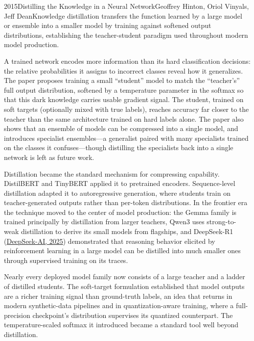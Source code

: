 
\begin{papersummary}{2015}{Distilling the Knowledge in a Neural Network}{Geoffrey Hinton, Oriol Vinyals, Jeff Dean}{Knowledge distillation transfers the function learned by a large model or ensemble into a smaller model by training against softened output distributions, establishing the teacher-student paradigm used throughout modern model production.}

A trained network encodes more information than its hard classification decisions: the relative probabilities it assigns to incorrect classes reveal how it generalizes. The paper proposes training a small ``student'' model to match the ``teacher's'' full output distribution, softened by a temperature parameter in the softmax so that this dark knowledge carries usable gradient signal. The student, trained on soft targets (optionally mixed with true labels), reaches accuracy far closer to the teacher than the same architecture trained on hard labels alone. The paper also shows that an ensemble of models can be compressed into a single model, and introduces specialist ensembles---a generalist paired with many specialists trained on the classes it confuses---though distilling the specialists back into a single network is left as future work.

Distillation became the standard mechanism for compressing capability. DistilBERT and TinyBERT applied it to pretrained encoders. Sequence-level distillation adapted it to autoregressive generation, where students train on teacher-generated outputs rather than per-token distributions. In the frontier era the technique moved to the center of model production: the Gemma family is trained principally by distillation from larger teachers, Qwen3 uses strong-to-weak distillation to derive its small models from flagships, and DeepSeek-R1 (\hyperref[paper:deepseek-2025-r1]{DeepSeek-AI, 2025}) demonstrated that reasoning behavior elicited by reinforcement learning in a large model can be distilled into much smaller ones through supervised training on its traces.

Nearly every deployed model family now consists of a large teacher and a ladder of distilled students. The soft-target formulation established that model outputs are a richer training signal than ground-truth labels, an idea that returns in modern synthetic-data pipelines and in quantization-aware training, where a full-precision checkpoint's distribution supervises its quantized counterpart. The temperature-scaled softmax it introduced became a standard tool well beyond distillation.

\end{papersummary}
